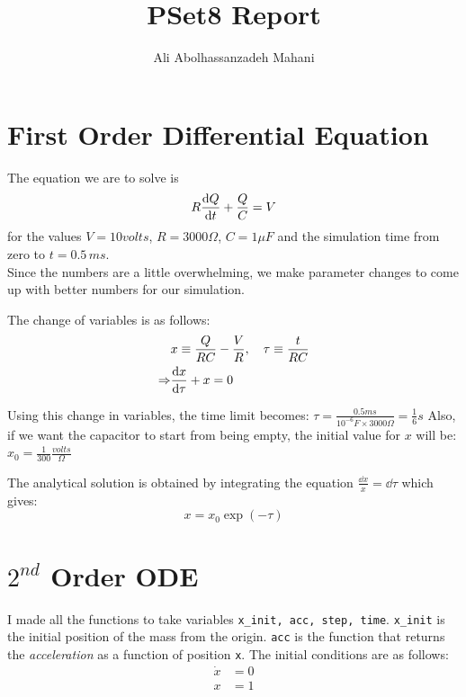 \documentclass[12pt, a4paper]{article}
\title{PSet8 Report}
\author{Ali Abolhassanzadeh Mahani}
\begin{document}
	\maketitle
	\section{First Order Differential Equation}
	The equation we are to solve is
	\begin{equation}
		R \dv{Q}{t} + \frac{Q}{C} = V
	\end{equation}
	for the values $V= 10 volts$, $R = 3000 \Omega$, $C = 1 \mu F$ and the simulation time from zero to $t = 0.5\, ms$.\\
	Since the numbers are a little overwhelming, we make parameter changes to come up with better numbers for our simulation.
	
	The change of variables is as follows:
	\begin{equation} \label{eq:change}
		\begin{aligned}
			&x \equiv \frac{Q}{R C} - \frac{V}{R}, \quad \tau \equiv \frac{t}{R C}\\
			\Rightarrow  &\dv{x}{\tau} + x = 0
		\end{aligned}
	\end{equation}
	
	Using this change in variables, the time limit becomes: $\tau = \frac{0.5 ms}{10^{-6} F \times 3000 \Omega} = \frac{1}{6} s$
	Also, if we want the capacitor to start from being empty, the initial value for $x$ will be: $x_0 = \frac{1}{300} \frac{volts}{\Omega}$
	
	The analytical solution is obtained by integrating the equation $\frac{\dd{x}}{x} = \dd{\tau}$
	which gives:
	\begin{equation} \label{eq:analytical}
		x = x_0 \exp(- \tau)
	\end{equation}
	\section{$2^{nd}$ Order ODE}
	I made all the functions to take variables \texttt{x\_init, acc, step, time}. \texttt{x\_init} is the initial position of the mass from the origin.
	\texttt{acc} is the function that returns the \emph{acceleration} as a function of position \texttt{x}.
	The initial conditions are as follows:
	\begin{equation}
		\begin{aligned}
			\dot{x} &= 0\\
			x & = 1
		\end{aligned}
	\end{equation}
	
\end{document}
